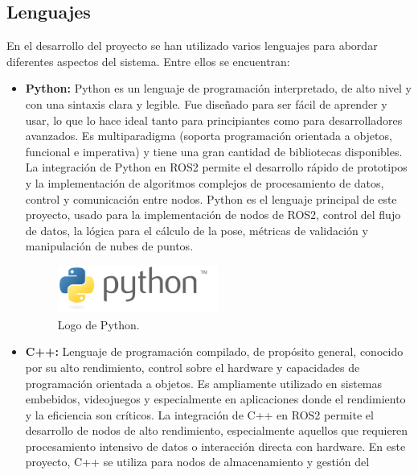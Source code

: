 \documentclass[12pt, a4paper, twoside]{article}
\begin{document}
\subsection{Lenguajes}
En el desarrollo del proyecto se han utilizado varios lenguajes para abordar diferentes aspectos del sistema.
Entre ellos se encuentran:

\begin{itemize}
  \item \textbf{Python:\cite{python}} Python\cite{python} es un lenguaje de programación interpretado, de alto nivel y con una sintaxis clara y legible. 
  Fue diseñado para ser fácil de aprender y usar, lo que lo hace ideal tanto para principiantes como para desarrolladores 
  avanzados. Es multiparadigma (soporta programación orientada a objetos, funcional e imperativa) y tiene una gran cantidad 
  de bibliotecas disponibles. La integración de Python\cite{python} en ROS2\cite{doi:10.1126/scirobotics.abm6074} permite el desarrollo rápido de prototipos y la implementación
  de algoritmos complejos de procesamiento de datos, control y comunicación entre nodos. Python\cite{python} es el lenguaje principal
  de este proyecto, usado para la implementación de nodos de ROS2\cite{doi:10.1126/scirobotics.abm6074}, control del flujo de datos, la lógica para el cálculo 
  de la pose, métricas de validación y manipulación de nubes de puntos.
  \begin{figure}[h]
    \centering
      \includegraphics[width=0.5\textwidth]{Python_logo.png} 
    \caption{Logo de Python\cite{python}.}
  \end{figure} 
  \item \textbf{C++:\cite{cpp}} Lenguaje de programación compilado, de propósito general, conocido por su alto rendimiento, 
  control sobre el hardware y capacidades de programación orientada a objetos. Es ampliamente utilizado en sistemas embebidos, 
  videojuegos y especialmente en aplicaciones donde el rendimiento y la eficiencia son críticos. La integración de C++\cite{cpp} 
  en ROS2\cite{doi:10.1126/scirobotics.abm6074} permite el desarrollo de nodos de alto rendimiento, especialmente aquellos que requieren procesamiento intensivo
  de datos o interacción directa con hardware. En este proyecto, C++\cite{cpp}  se utiliza para nodos de almacenamiento y gestión del

\end{itemize}
\end{document}

